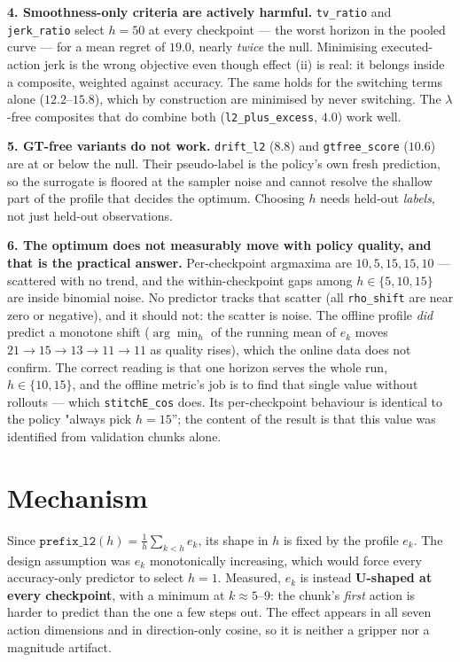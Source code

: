 \documentclass[11pt]{article}
\begin{document}
\textbf{4. Smoothness-only criteria are actively harmful.} \texttt{tv\_ratio} and
\texttt{jerk\_ratio} select $h=50$ at every checkpoint --- the worst horizon in the pooled curve ---
for a mean regret of $19.0$, nearly \emph{twice} the null. Minimising executed-action jerk is the
wrong objective even though effect (ii) is real: it belongs inside a composite, weighted against
accuracy. The same holds for the switching terms alone ($12.2$--$15.8$), which by construction are
minimised by never switching. The $\lambda$-free composites that do combine both
(\texttt{l2\_plus\_excess}, $4.0$) work well.

\textbf{5. GT-free variants do not work.} \texttt{drift\_l2} ($8.8$) and \texttt{gtfree\_score}
($10.6$) are at or below the null. Their pseudo-label is the policy's own fresh prediction, so the
surrogate is floored at the sampler noise and cannot resolve the shallow part of the profile that
decides the optimum. Choosing $h$ needs held-out \emph{labels}, not just held-out observations.

\textbf{6. The optimum does not measurably move with policy quality, and that is the practical
answer.} Per-checkpoint argmaxima are $10,5,15,15,10$ --- scattered with no trend, and the
within-checkpoint gaps among $h\in\{5,10,15\}$ are inside binomial noise. No predictor tracks that
scatter (all \texttt{rho\_shift} are near zero or negative), and it should not: the scatter is noise.
The offline profile \emph{did} predict a monotone shift ($\arg\min_h$ of the running mean of $e_k$
moves $21\to15\to13\to11\to11$ as quality rises), which the online data does not confirm. The correct
reading is that one horizon serves the whole run, $h\in\{10,15\}$, and the offline metric's job is to
find that single value without rollouts --- which \texttt{stitchE\_cos} does. Its per-checkpoint
behaviour is identical to the policy "always pick $h=15$''; the content of the result is that this
value was identified from validation chunks alone.

\section{Mechanism}

Since $\texttt{prefix\_l2}(h)=\frac1h\sum_{k<h}e_k$, its shape in $h$ is fixed by the profile $e_k$.
The design assumption was $e_k$ monotonically increasing, which would force every accuracy-only
predictor to select $h=1$. Measured, $e_k$ is instead \textbf{U-shaped at every checkpoint}, with a
minimum at $k\approx5$--$9$: the chunk's \emph{first} action is harder to predict than the one a few
steps out. The effect appears in all seven action dimensions and in direction-only cosine, so it is
neither a gripper nor a magnitude artifact.
\end{document}
